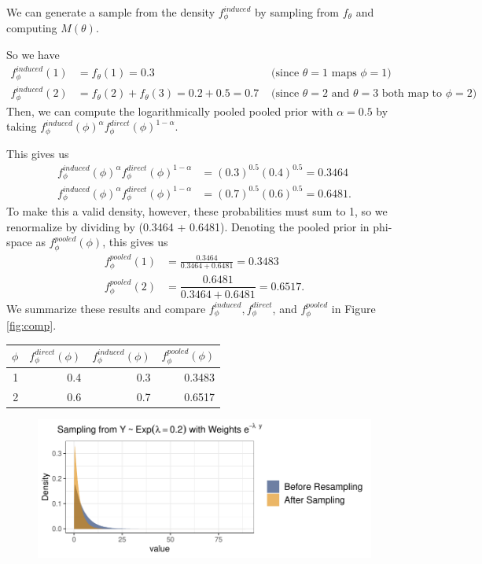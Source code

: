 \documentclass[12pt,twoside]{smiththesis}
\begin{document}
We can generate a sample from the density \(f_\phi^{induced}\) by sampling from \(f_\theta\) and computing \(M(\theta)\).

So we have
\begin{align*}
f_\phi^{induced}(1) &= f_{\theta}(1) = 0.3 & \text{ (since $\theta = 1$ maps $\phi = 1$) } \\
f_\phi^{induced}(2) &= f_{\theta}(2) +  f_{\theta}(3) = 0.2 + 0.5=  0.7 & \text{ (since $\theta = 2$ and $\theta=3$ both map to $\phi = 2$) }
\end{align*}
Then, we can compute the logarithmically pooled pooled prior with \(\alpha=0.5\) by taking \(f_\phi^{induced}(\phi)^{\alpha} f_\phi^{direct}(\phi)^{1-\alpha}\).

This gives us
\begin{align*}
f_\phi^{induced}(\phi)^{\alpha} f_\phi^{direct}(\phi)^{1-\alpha} &= (0.3)^{0.5}(0.4)^{0.5} = 0.3464\\
f_\phi^{induced}(\phi)^{\alpha} f_\phi^{direct}(\phi)^{1-\alpha} &= (0.7)^{0.5}(0.6)^{0.5} = 0.6481.
\end{align*}
To make this a valid density, however, these probabilities must sum to 1, so we renormalize by dividing by (0.3464 + 0.6481). Denoting the pooled prior in phi-space as \(f_\phi^{pooled}(\phi)\), this gives us
\begin{align*}
f_\phi^{pooled}(1) &= \frac{ 0.3464  }  { 0.3464 + 0.6481 } = 0.3483 \\
f_\phi^{pooled}(2) &= \dfrac{ 0.6481 } { 0.3464 + 0.6481}  =0.6517.
\end{align*}
We summarize these results and compare \(f_\phi^{induced}, f_\phi^{direct}\), and \(f_\phi^{pooled}\) in Figure \ref{fig:comp}.
\begin{multicols}{2}
\begin{table}[H]
\centering
\begin{tabular}[t]{r|r|r|r}
\hline
$\phi$ & $f_\phi^{direct}(\phi)$ & $f_\phi^{induced}(\phi)$ & $f_\phi^{pooled}(\phi)$\\
\hline
1 & 0.4 & 0.3 & 0.3483\\
\hline
2 & 0.6 & 0.7 & 0.6517\\
\hline
\end{tabular}
\end{table}
\columnbreak
\begin{figure}

{\centering \includegraphics[width=1\linewidth]{thesis_files/figure-latex/unnamed-chunk-15-1} 

}

\caption{\label{fig:comp}}\label{fig:unnamed-chunk-15}
\end{figure}
\end{multicols}
\end{document}
